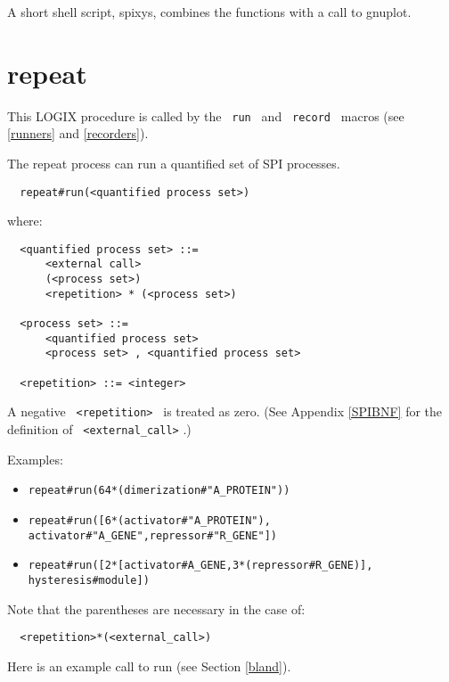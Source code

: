 \noindent
A short shell script, spixys, combines the functions with a call to gnuplot.

\section{repeat}
\label{repeat}
This LOGIX procedure is called by the \verb+ run + and
\verb+ record + macros (see \ref{runners} and
\ref{recorders}).

\noindent
The repeat process can run a quantified set of SPI
processes.

\begin{verbatim}
  repeat#run(<quantified process set>)
\end{verbatim}

\noindent
where:

\begin{verbatim}
  <quantified process set> ::=
      <external call>
      (<process set>)
      <repetition> * (<process set>)

  <process set> ::=
      <quantified process set>
      <process set> , <quantified process set>

  <repetition> ::= <integer>
\end{verbatim}

\noindent
A negative \verb+ <repetition> + is treated as zero.
\noindent
(See Appendix \ref{SPIBNF} for the definition of \verb+ <external_call>+ .)

\noindent
Examples:

\begin{itemize}
\item
\verb+repeat#run(64*(dimerization#"A_PROTEIN"))+
\item
\verb+repeat#run([6*(activator#"A_PROTEIN"),+ \linebreak
\verb+            activator#"A_GENE",repressor#"R_GENE"])+
\item
\verb+repeat#run([2*[activator#A_GENE,3*(repressor#R_GENE)],+ \linebreak
\verb+            hysteresis#module])+
\end{itemize}

\noindent
Note that the parentheses are necessary in the case of:

\begin{verbatim}
  <repetition>*(<external_call>)
\end{verbatim}

\noindent
Here is an example call to run (see Section \ref{bland}).

